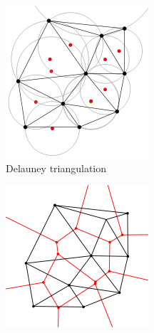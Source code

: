 \begin{center}
    \begin{figure}[H]
        \centering
        \begin{subfigure}[b]{0.45\textwidth}
            \centering
            \includegraphics[width=\textwidth]{resources/images/introduction/Delaunay_circumcircles_centers.svg.png}
            \caption{Delauney triangulation}
            \label{fig:delauneyTriangulation}
        \end{subfigure}
        \hfill
        \begin{subfigure}[b]{0.45\textwidth}
            \centering
            \includegraphics[width=\textwidth]{resources/images/introduction/Delaunay_Voronoi.svg.png}

\end{subfigure}
\end{figure}
\end{center}
